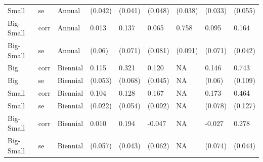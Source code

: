 \begin{tabular}{l|l|l|l|l|l|l|l|l}
Small & se & Annual & (0.042) & (0.041) & (0.048) & (0.038) & (0.033) & (0.055)\\
Big-Small & corr & Annual & 0.013 & 0.137 & 0.065 & 0.758 & 0.095 & 0.164\\
Big-Small & se & Annual & (0.06) & (0.071) & (0.081) & (0.091) & (0.071) & (0.042)\\
Big & corr & Biennial & 0.115 & 0.321 & 0.120 & NA & 0.146 & 0.743\\
Big & se & Biennial & (0.053) & (0.068) & (0.045) & NA & (0.06) & (0.109)\\
Small & corr & Biennial & 0.104 & 0.128 & 0.167 & NA & 0.173 & 0.464\\
Small & se & Biennial & (0.022) & (0.054) & (0.092) & NA & (0.078) & (0.127)\\
Big-Small & corr & Biennial & 0.010 & 0.194 & -0.047 & NA & -0.027 & 0.278\\
Big-Small & se & Biennial & (0.057) & (0.043) & (0.062) & NA & (0.074) & (0.044)\\
\hline
\end{tabular}
